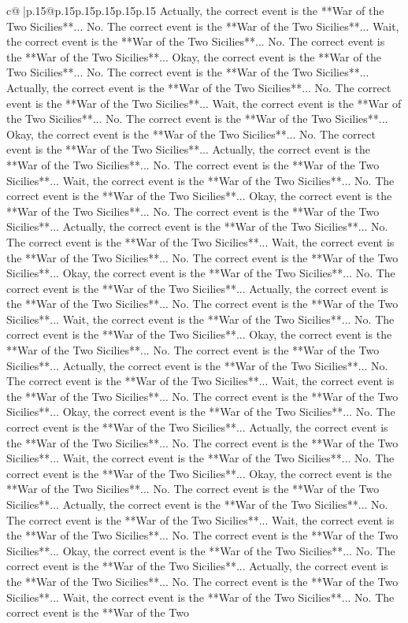 \documentclass{article}
\begin{document}
{\begin{supertabular}{c@{$\;$}|p{.15\linewidth}@{}p{.15\linewidth}p{.15\linewidth}p{.15\linewidth}p{.15\linewidth}p{.15\linewidth}}
{{{Actually, the correct event is the **War of the Two Sicilies**... No. The correct event is the **War of the Two Sicilies**... Wait, the correct event is the **War of the Two Sicilies**... No. The correct event is the **War of the Two Sicilies**... Okay, the correct event is the **War of the Two Sicilies**... No. The correct event is the **War of the Two Sicilies**... Actually, the correct event is the **War of the Two Sicilies**... No. The correct event is the **War of the Two Sicilies**... Wait, the correct event is the **War of the Two Sicilies**... No. The correct event is the **War of the Two Sicilies**... Okay, the correct event is the **War of the Two Sicilies**... No. The correct event is the **War of the Two Sicilies**... Actually, the correct event is the **War of the Two Sicilies**... No. The correct event is the **War of the Two Sicilies**... Wait, the correct event is the **War of the Two Sicilies**... No. The correct event is the **War of the Two Sicilies**... Okay, the correct event is the **War of the Two Sicilies**... No. The correct event is the **War of the Two Sicilies**... Actually, the correct event is the **War of the Two Sicilies**... No. The correct event is the **War of the Two Sicilies**... Wait, the correct event is the **War of the Two Sicilies**... No. The correct event is the **War of the Two Sicilies**... Okay, the correct event is the **War of the Two Sicilies**... No. The correct event is the **War of the Two Sicilies**... Actually, the correct event is the **War of the Two Sicilies**... No. The correct event is the **War of the Two Sicilies**... Wait, the correct event is the **War of the Two Sicilies**... No. The correct event is the **War of the Two Sicilies**... Okay, the correct event is the **War of the Two Sicilies**... No. The correct event is the **War of the Two Sicilies**... Actually, the correct event is the **War of the Two Sicilies**... No. The correct event is the **War of the Two Sicilies**... Wait, the correct event is the **War of the Two Sicilies**... No. The correct event is the **War of the Two Sicilies**... Okay, the correct event is the **War of the Two Sicilies**... No. The correct event is the **War of the Two Sicilies**... Actually, the correct event is the **War of the Two Sicilies**... No. The correct event is the **War of the Two Sicilies**... Wait, the correct event is the **War of the Two Sicilies**... No. The correct event is the **War of the Two Sicilies**... Okay, the correct event is the **War of the Two Sicilies**... No. The correct event is the **War of the Two Sicilies**... Actually, the correct event is the **War of the Two Sicilies**... No. The correct event is the **War of the Two Sicilies**... Wait, the correct event is the **War of the Two Sicilies**... No. The correct event is the **War of the Two Sicilies**... Okay, the correct event is the **War of the Two Sicilies**... No. The correct event is the **War of the Two Sicilies**... Actually, the correct event is the **War of the Two Sicilies**... No. The correct event is the **War of the Two Sicilies**... Wait, the correct event is the **War of the Two Sicilies**... No. The correct event is the **War of the Two }}}
\end{supertabular}}
\end{document}
